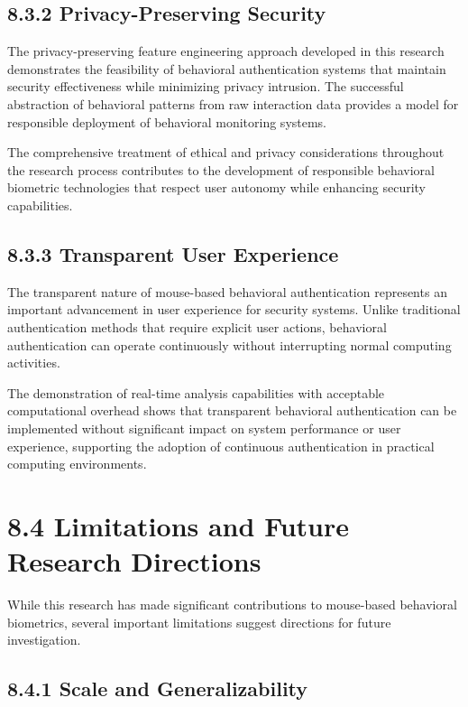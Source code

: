 \documentclass[
  12pt,
  a4paper,
]{report}
\begin{document}
\subsection{8.3.2 Privacy-Preserving
Security}\label{privacy-preserving-security}

The privacy-preserving feature engineering approach developed in this
research demonstrates the feasibility of behavioral authentication
systems that maintain security effectiveness while minimizing privacy
intrusion. The successful abstraction of behavioral patterns from raw
interaction data provides a model for responsible deployment of
behavioral monitoring systems.

The comprehensive treatment of ethical and privacy considerations
throughout the research process contributes to the development of
responsible behavioral biometric technologies that respect user autonomy
while enhancing security capabilities.

\subsection{8.3.3 Transparent User
Experience}\label{transparent-user-experience}

The transparent nature of mouse-based behavioral authentication
represents an important advancement in user experience for security
systems. Unlike traditional authentication methods that require explicit
user actions, behavioral authentication can operate continuously without
interrupting normal computing activities.

The demonstration of real-time analysis capabilities with acceptable
computational overhead shows that transparent behavioral authentication
can be implemented without significant impact on system performance or
user experience, supporting the adoption of continuous authentication in
practical computing environments.

\section{8.4 Limitations and Future Research
Directions}\label{limitations-and-future-research-directions}

While this research has made significant contributions to mouse-based
behavioral biometrics, several important limitations suggest directions
for future investigation.

\subsection{8.4.1 Scale and
Generalizability}\label{scale-and-generalizability}
\end{document}
